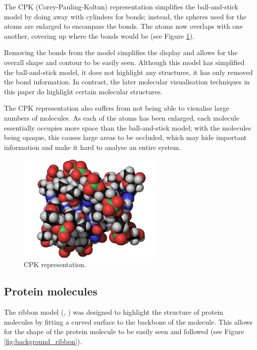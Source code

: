 The CPK (Corey-Pauling-Koltun) \citep{corey53} representation simplifies the
ball-and-stick model by doing away with cylinders for bonds; instead, the
spheres used for the atoms are enlarged to encompass the bonds. The atoms now
overlaps with one another, covering up where the bonds would be (see Figure
\ref{fig:background_cpk}).

Removing the bonds from the model simplifies the display and allows for the
overall shape and contour to be easily seen. Although this model has simplified
the ball-and-stick model, it does not highlight any structures, it has only
removed the bond information. In contrast, the later molecular visualisation
techniques in this paper do highlight certain molecular structures.

The CPK representation also suffers from not being able to visualise large
numbers of molecules. As each of the atoms has been enlarged, each molecule
essentially occupies more space than the ball-and-stick model; with the
molecules being opaque, this causes large areas to be occluded, which may hide
important information and make it hard to analyse an entire system.

\begin{figure}[h!]
  \begin{center}
    \includegraphics[width=70mm]{cpk}
  \end{center}
  \caption{CPK representation.}
  \label{fig:background_cpk}
\end{figure}


\subsection{Protein molecules}
\label{sub:background_protein}

The ribbon model (\citep{richardson81}, \citep{carson87}) was designed to
highlight the structure of protein molecules by fitting a curved surface to the
backbone of the molecule. This allows for the shape of the protein molecule to
be easily seen and followed (see Figure \ref{fig:background_ribbon}).

